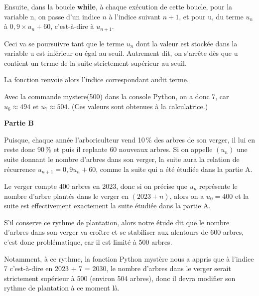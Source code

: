 \begin{enumerate}
Ensuite, dans la boucle \textbf{while}, à chaque exécution de cette boucle, pour la variable n, on passe d'un indice $n$ à l'indice suivant $n + 1$, et pour u, du terme $u_n$ à $0,9\times u_n + 60$, c'est-à-dire à $u_{n+1}$.

Ceci va se poursuivre tant que le terme $u_n$ dont la valeur est stockée dans la variable u est inférieur ou égal au seuil. Autrement dit, on s'arrête dès que u contient un terme de la suite strictement supérieur au seuil.

La fonction renvoie alors l'indice correspondant audit terme.

Avec la commande mystere(500) dans la console Python, on a donc 7, car $u_6 \approx 494$ et $u_7 \approx 504$. (Ces valeurs sont obtenues à la calculatrice.)
	\end{enumerate}

	\medskip

	\textbf{Partie B}

	\medskip


Puisque, chaque année l'arboriculteur vend 10\,\% des arbres de son verger, il lui en reste donc 90\,\% et puis il replante $60$ nouveaux arbres. Si on appelle $(u_n)$ une suite donnant le nombre d'arbres dans son verger, la suite aura la relation de récurrence $u_{n+1} = 0,9u_n + 60$, comme la suite qui a été étudiée dans la partie A.

Le verger compte $400$ arbres en 2023, donc si on précise que $u_n$ représente le nombre d'arbre plantés dans le verger en $(2023 + n)$, alors on a $u_0 = 400$ et la suite est effectivement exactement la suite étudiée dans la partie A.

S'il conserve ce rythme de plantation, alors notre étude dit que le nombre d'arbres dans son verger va croître et se stabiliser aux alentours de 600 arbres, c'est donc problématique, car il est limité à 500 arbres.

	Notamment, à ce rythme, la fonction Python mystère nous a appris que à l'indice 7 c'est-à-dire en 2023 + 7 = 2030, le nombre d'arbres dans le verger serait strictement supérieur à 500 (environ 504 arbres), donc il devra modifier son rythme de plantation à ce moment là.

\bigskip

